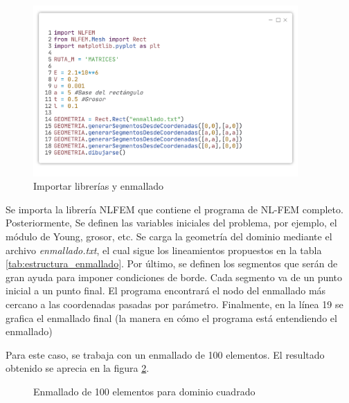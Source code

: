 \begin{enumerate}
		\begin{figure}
			\centering
			\sffamily
			\includegraphics[width=0.9\textwidth]{figuras/placa_c1.pdf}
			\caption{Importar librerías y enmallado}
			\label{fig:imports_placa}
		\end{figure}
		Se importa la librería NLFEM que contiene el programa de NL-FEM completo. Posteriormente, Se definen las variables iniciales del problema, por ejemplo, el módulo de Young, grosor, etc. Se carga la geometría del dominio mediante el archivo \textit{enmallado.txt}, el cual sigue los lineamientos propuestos en la tabla \ref{tab:estructura_enmallado}. Por último, se definen los segmentos que serán de gran ayuda para imponer condiciones de borde. Cada segmento va de un punto inicial a un punto final. El programa encontrará el nodo del enmallado más cercano a las coordenadas pasadas por parámetro. Finalmente, en la línea 19 se grafica el enmallado final (la manera en cómo el programa está entendiendo el enmallado)

		Para este caso, se trabaja con un enmallado de 100 elementos. El resultado obtenido se aprecia en la figura \ref{fig:enmallado1010placa}.

		\begin{figure}
			\centering
			\sffamily
			\caption{Enmallado de 100 elementos para dominio cuadrado}
			\label{fig:enmallado1010placa}
		\end{figure}


\end{enumerate}

